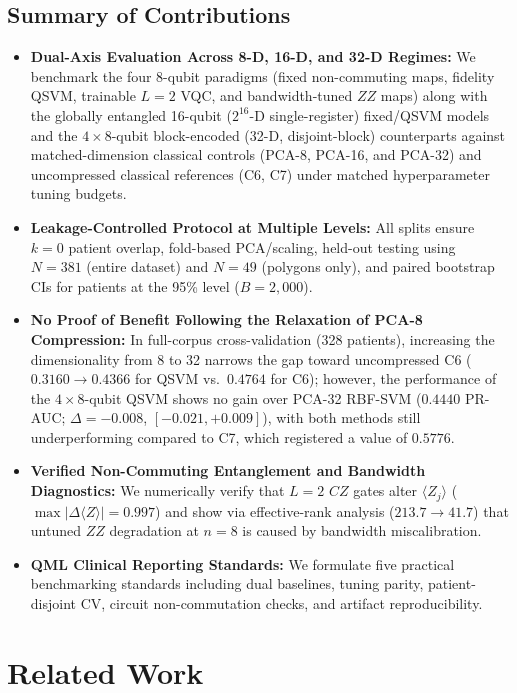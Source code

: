 \documentclass[conference]{IEEEtran}
\begin{document}
\subsection{Summary of Contributions}
\begin{itemize}
    \item \textbf{Dual-Axis Evaluation Across 8-D, 16-D, and 32-D Regimes:} We benchmark the four 8-qubit paradigms (fixed non-commuting maps, fidelity QSVM, trainable $L=2$ VQC, and bandwidth-tuned $ZZ$ maps) along with the globally entangled 16-qubit ($2^{16}$-D single-register) fixed/QSVM models and the $4 \times 8$-qubit block-encoded (32-D, disjoint-block) counterparts against matched-dimension classical controls (PCA-8, PCA-16, and PCA-32) and uncompressed classical references (C6, C7) under matched hyperparameter tuning budgets.
    \item \textbf{Leakage-Controlled Protocol at Multiple Levels:} All splits ensure $k=0$ patient overlap, fold-based PCA/scaling, held-out testing using $N=381$ (entire dataset) and $N=49$ (polygons only), and paired bootstrap CIs for patients at the 95\% level ($B=2,000$).
    \item \textbf{No Proof of Benefit Following the Relaxation of PCA-8 Compression:} In full-corpus cross-validation (328 patients), increasing the dimensionality from 8 to 32 narrows the gap toward uncompressed C6 ($0.3160 \to 0.4366$ for QSVM vs.\ $0.4764$ for C6); however, the performance of the $4 \times 8$-qubit QSVM shows no gain over PCA-32 RBF-SVM ($0.4440$ PR-AUC; $\Delta = -0.008$, $[-0.021, +0.009]$), with both methods still underperforming compared to C7, which registered a value of $0.5776$.
    \item \textbf{Verified Non-Commuting Entanglement and Bandwidth Diagnostics:} We numerically verify that $L=2$ $CZ$ gates alter $\langle Z_j\rangle$ ($\max|\Delta\langle Z\rangle| = 0.997$) and show via effective-rank analysis ($213.7 \to 41.7$) that untuned $ZZ$ degradation at $n=8$ is caused by bandwidth miscalibration.
    \item \textbf{QML Clinical Reporting Standards:} We formulate five practical benchmarking standards including dual baselines, tuning parity, patient-disjoint CV, circuit non-commutation checks, and artifact reproducibility.
\end{itemize}

\section{Related Work}
\end{document}

